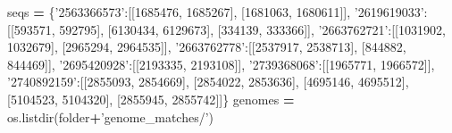 \documentclass[
]{article}
\newenvironment{Shaded}{\begin{snugshade}}{\end{snugshade}}
\newcommand{\DecValTok}[1]{\textcolor[rgb]{0.00,0.00,0.81}{#1}}
\newcommand{\NormalTok}[1]{#1}
\newcommand{\OperatorTok}[1]{\textcolor[rgb]{0.81,0.36,0.00}{\textbf{#1}}}
\newcommand{\StringTok}[1]{\textcolor[rgb]{0.31,0.60,0.02}{#1}}
\begin{document}
\begin{Shaded}
\begin{Highlighting}[]
\NormalTok{seqs }\OperatorTok{=}\NormalTok{ \{}\StringTok{'2563366573'}\NormalTok{:[[}\DecValTok{1685476}\NormalTok{, }\DecValTok{1685267}\NormalTok{], [}\DecValTok{1681063}\NormalTok{, }\DecValTok{1680611}\NormalTok{]], }
        \StringTok{'2619619033'}\NormalTok{:[[}\DecValTok{593571}\NormalTok{, }\DecValTok{592795}\NormalTok{], [}\DecValTok{6130434}\NormalTok{, }\DecValTok{6129673}\NormalTok{], [}\DecValTok{334139}\NormalTok{, }\DecValTok{333366}\NormalTok{]], }
        \StringTok{'2663762721'}\NormalTok{:[[}\DecValTok{1031902}\NormalTok{, }\DecValTok{1032679}\NormalTok{], [}\DecValTok{2965294}\NormalTok{, }\DecValTok{2964535}\NormalTok{]],}
        \StringTok{'2663762778'}\NormalTok{:[[}\DecValTok{2537917}\NormalTok{, }\DecValTok{2538713}\NormalTok{], [}\DecValTok{844882}\NormalTok{, }\DecValTok{844469}\NormalTok{]],}
        \StringTok{'2695420928'}\NormalTok{:[[}\DecValTok{2193335}\NormalTok{, }\DecValTok{2193108}\NormalTok{]],}
        \StringTok{'2739368068'}\NormalTok{:[[}\DecValTok{1965771}\NormalTok{, }\DecValTok{1966572}\NormalTok{]],}
        \StringTok{'2740892159'}\NormalTok{:[[}\DecValTok{2855093}\NormalTok{, }\DecValTok{2854669}\NormalTok{], [}\DecValTok{2854022}\NormalTok{, }\DecValTok{2853636}\NormalTok{], [}\DecValTok{4695146}\NormalTok{, }\DecValTok{4695512}\NormalTok{], [}\DecValTok{5104523}\NormalTok{, }\DecValTok{5104320}\NormalTok{], [}\DecValTok{2855945}\NormalTok{, }\DecValTok{2855742}\NormalTok{]]\}}
\NormalTok{genomes }\OperatorTok{=}\NormalTok{ os.listdir(folder}\OperatorTok{+}\StringTok{'genome_matches/'}\NormalTok{)}


\end{Highlighting}
\end{Shaded}
\end{document}
